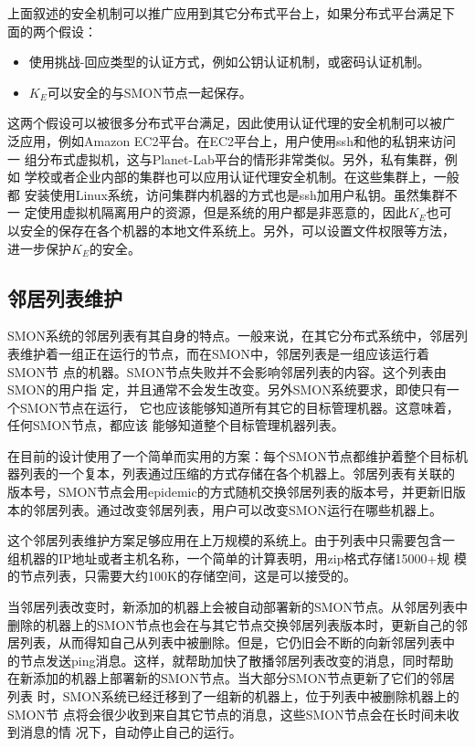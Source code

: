 上面叙述的安全机制可以推广应用到其它分布式平台上，如果分布式平台满足下
面的两个假设：

\begin{itemize}
  \item 使用挑战-回应类型的认证方式，例如公钥认证机制，或密码认证机制。
  
  \item $K_E$可以安全的与SMON节点一起保存。
\end{itemize}

这两个假设可以被很多分布式平台满足，因此使用认证代理的安全机制可以被广
泛应用，例如Amazon EC2平台。在EC2平台上，用户使用ssh和他的私钥来访问一
组分布式虚拟机，这与Planet-Lab平台的情形非常类似。另外，私有集群，例如
学校或者企业内部的集群也可以应用认证代理安全机制。在这些集群上，一般都
安装使用Linux系统，访问集群内机器的方式也是ssh加用户私钥。虽然集群不一
定使用虚拟机隔离用户的资源，但是系统的用户都是非恶意的，因此$K_E$也可
以安全的保存在各个机器的本地文件系统上。另外，可以设置文件权限等方法，
进一步保护$K_E$的安全。

\subsection{邻居列表维护}

SMON系统的邻居列表有其自身的特点。一般来说，在其它分布式系统中，邻居列
表维护着一组正在运行的节点，而在SMON中，邻居列表是一组应该运行着SMON节
点的机器。SMON节点失败并不会影响邻居列表的内容。这个列表由SMON的用户指
定，并且通常不会发生改变。另外SMON系统要求，即使只有一个SMON节点在运行，
它也应该能够知道所有其它的目标管理机器。这意味着，任何SMON节点，都应该
能够知道整个目标管理机器列表。

在目前的设计使用了一个简单而实用的方案：每个SMON节点都维护着整个目标机
器列表的一个复本，列表通过压缩的方式存储在各个机器上。邻居列表有关联的
版本号，SMON节点会用epidemic的方式随机交换邻居列表的版本号，并更新旧版
本的邻居列表。通过改变邻居列表，用户可以改变SMON运行在哪些机器上。

这个邻居列表维护方案足够应用在上万规模的系统上。由于列表中只需要包含一
组机器的IP地址或者主机名称，一个简单的计算表明，用zip格式存储15000+规
模的节点列表，只需要大约100K的存储空间，这是可以接受的。

当邻居列表改变时，新添加的机器上会被自动部署新的SMON节点。从邻居列表中
删除的机器上的SMON节点也会在与其它节点交换邻居列表版本时，更新自己的邻
居列表，从而得知自己从列表中被删除。但是，它仍旧会不断的向新邻居列表中
的节点发送ping消息。这样，就帮助加快了散播邻居列表改变的消息，同时帮助
在新添加的机器上部署新的SMON节点。当大部分SMON节点更新了它们的邻居列表
时，SMON系统已经迁移到了一组新的机器上，位于列表中被删除机器上的SMON节
点将会很少收到来自其它节点的消息，这些SMON节点会在长时间未收到消息的情
况下，自动停止自己的运行。

